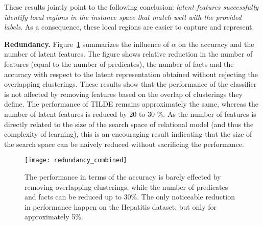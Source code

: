 These results jointly point to the following conclusion: \textit{latent features successfully identify local regions in the instance space that match well with the provided labels}.
As a consequence, these local regions are easier to capture and represent.









\textbf{Redundancy.}
Figure~\ref{fig:Redundancy} summarizes the influence of $\alpha$ on the accuracy and the number of latent features.
The figure shows relative reduction in the number of features (equal to the number of predicates), the number of facts and the accuracy with  respect to the latent representation obtained without rejecting the overlapping clusterings.
These results show that the performance of the classifier is not affected by removing features based on the overlap of clusterings they define.
The performance of TILDE remains approximately the same, whereas the number of latent features is reduced by 20 to 30 \%.
As the number of features is directly related to the size of the search space of relational model (and thus the complexity of learning), this is an encouraging result indicating that the size of the search space can be naively reduced without sacrificing the performance.








\begin{figure}[t]
	\centering
	\medskip
    \texttt{[image: redundancy\_combined]}
    \caption{The performance in terms of the accuracy is barely effected by removing overlapping clusterings, while the number of predicates and facts can be reduced up to 30\%. The only noticeable reduction in performance happen on the Hepatitis dataset, but only for approximately 5\%.   }
    \label{fig:Redundancy}
\end{figure}







